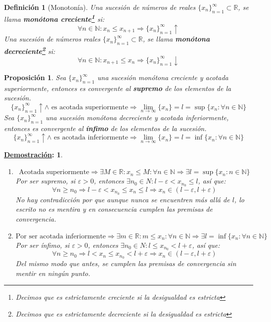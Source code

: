 \documentclass[10pt,a4paper,openright]{book}
\theoremstyle{break}
\newtheorem*{defi}{Definición}
\newtheorem*{prop}{Proposición}
\newtheorem*{demo}{\underline{Demostración}:}
\begin{document}
\begin{defi}[Monotonía]
Una sucesión de números de reales $\{x_n\}_{n=1}^\infty\subset \mathbb R$, se llama \textbf{monótona creciente\footnote{Decimos que es estrictamente creciente si la desigualdad es estricta}} si:
$$\forall n\in \mathbb N: x_n\leq x_{n+1}\Rightarrow \{x_n\}_{n=1}^\infty \uparrow$$
Una sucesión de números reales $\{x_n\}_{n=1}^\infty\subset \mathbb R$, se llama \textbf{monótona decreciente\footnote{Decimos que es estrictamente decreciente si la desigualdad es estricta}} si:
$$\forall n\in \mathbb N: x_{n+1}\leq x_n \Rightarrow \{x_n\}_{n=1}^\infty \downarrow$$
\end{defi}

\begin{prop}
Sea $\{x_n\}_{n=1}^\infty$ una sucesión monótona creciente y acotada superiormente, entonces es convergente al \textbf{supremo} de los elementos de la sucesión.
$$\{x_n\}_{n=1}^\infty \uparrow \wedge \mbox{ es acotada superiormente}\Rightarrow \lim_{n\rightarrow \infty} \{x_n\}=l=\sup\{x_n: \forall n\in \mathbb N\}$$
Sea $\{x_n\}_{n=1}^\infty$ una sucesión monótona decreciente y acotada inferiormente, entonces es convergente al \textbf{ínfimo} de los elementos de la sucesión.
$$\{x_n\}_{n=1}^\infty \uparrow \wedge \mbox{ es acotada inferiormente}\Rightarrow \lim_{n\rightarrow \infty} \{x_n\}=l=\inf\{x_n: \forall n\in \mathbb N\}$$
\end{prop}
\begin{demo}
\begin{enumerate}
\item 
$$\mbox{Acotada superiormente}\Rightarrow \exists M\in \mathbb R: x_n\leq M: \forall n\in \mathbb N\Rightarrow \exists l=\sup\{x_n: n\in \mathbb N\}$$
Por ser supremo, si $\varepsilon>0$, entonces $\exists n_0\in N: l-\varepsilon<x_{n_0}\leq l$, así que:
$$\forall n\geq n_0\Rightarrow l-\varepsilon< x_{n_0}\leq x_n\leq l \Rightarrow x_n\in (l-\varepsilon, l+\varepsilon)$$
No hay contradicción por que aunque nunca se encuentren más allá de $l$, lo escrito no es mentira y en consecuencia cumplen las premisas de convergencia.

\item 
$$\mbox{Por ser acotada inferiormente}\Rightarrow \exists m\in \mathbb R: m\leq x_n: \forall n\in \mathbb N\Rightarrow \exists l=\inf\{x_n: \forall n\in \mathbb N\}$$
Por ser ínfimo, si $\varepsilon>0$, entonces $\exists n_0\in N: l\leq x_{n_0}<l+\varepsilon$, así que:
$$\forall n\geq n_0\Rightarrow l< x_n\leq x_{n_0} <l+\varepsilon \Rightarrow x_n\in (l-\varepsilon, l+\varepsilon)$$
Del mismo modo que antes, se cumplen las premisas de convergencia sin mentir en ningún punto.
\end{enumerate}
\end{demo}
\end{document}
